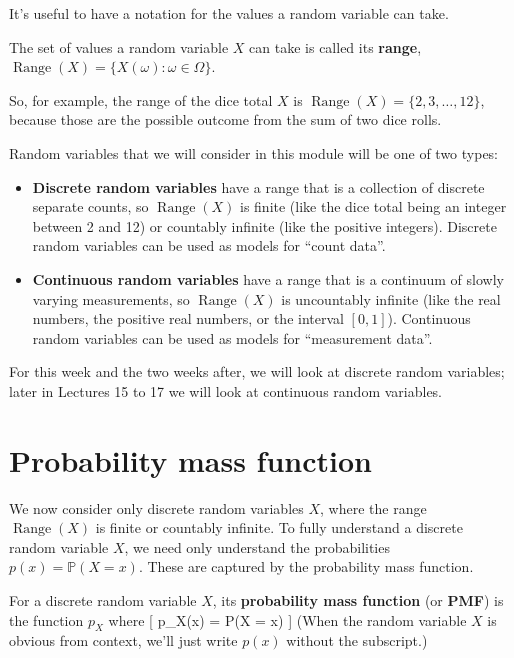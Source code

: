 \documentclass[
  letterpaper,
  DIV=11,
  numbers=noendperiod]{scrreprt}
\providecommand{\tightlist}{%
  \setlength{\itemsep}{0pt}\setlength{\parskip}{0pt}}\usepackage{longtable,booktabs,array}
\theoremstyle{remark}
\begin{document}
It's useful to have a notation for the values a random variable can
take.

\newcommand{\Range}{\operatorname{Range}}

The set of values a random variable \(X\) can take is called its
\textbf{range},
\(\operatorname{Range}(X) = \{X(\omega) : \omega \in \Omega \}\).

So, for example, the range of the dice total \(X\) is
\(\operatorname{Range}(X) = \{2, 3, \dots, 12\}\), because those are the
possible outcome from the sum of two dice rolls.

Random variables that we will consider in this module will be one of two
types:

\begin{itemize}
\tightlist
\item
  \textbf{Discrete random variables} have a range that is a collection
  of discrete separate counts, so \(\operatorname{Range}(X)\) is finite
  (like the dice total being an integer between 2 and 12) or countably
  infinite (like the positive integers). Discrete random variables can
  be used as models for ``count data''.
\item
  \textbf{Continuous random variables} have a range that is a continuum
  of slowly varying measurements, so \(\operatorname{Range}(X)\) is
  uncountably infinite (like the real numbers, the positive real
  numbers, or the interval \([0,1]\)). Continuous random variables can
  be used as models for ``measurement data''.
\end{itemize}

For this week and the two weeks after, we will look at discrete random
variables; later in Lectures 15 to 17 we will look at continuous random
variables.

\hypertarget{pmf}{%
\section{Probability mass function}\label{pmf}}

We now consider only discrete random variables \(X\), where the range
\(\operatorname{Range}(X)\) is finite or countably infinite. To fully
understand a discrete random variable \(X\), we need only understand the
probabilities \(p(x) = \mathbb P(X = x)\). These are captured by the
probability mass function.

For a discrete random variable \(X\), its \textbf{probability mass
function} (or \textbf{PMF}) is the function \(p_X\) where {[} p\_X(x) =
\mathbb P(X = x) \qquad {} {]}
(When the random variable \(X\) is obvious from context, we'll just
write \(p(x)\) without the subscript.)
\end{document}
